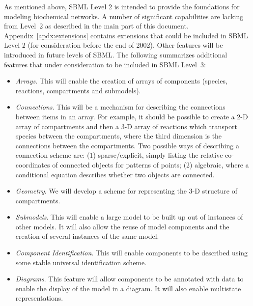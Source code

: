 \documentclass[10pt,twocolumntoc]{cekarticle}
\begin{document}
As mentioned above, SBML Level 2 is intended to provide the foundations for
modeling biochemical networks.  A number of significant capabilities are
lacking from Level~2 as described in the main part of this document.
Appendix~\ref{apdx:extensions} contains extensions that could be included
in SBML Level 2 (for consideration before the end of 2002). Other features
will be introduced in future levels of SBML.  The following summarizes
additional features that under consideration to be included in SBML
Level~3:
\begin{itemize}

\item \emph{Arrays}.  This will enable the creation of arrays of components
  (species, reactions, compartments and submodels).

\item \emph{Connections}.  This will be a mechanism for describing the
  connections between items in an array.  For example, it should be
  possible to create a 2-D array of compartments and then a 3-D array of
  reactions which transport species between the compartments, where the
  third dimension is the connections between the compartments.  Two
  possible ways of describing a connection scheme are: (1) sparse/explicit,
  simply listing the relative co-coordinates of connected objects for
  patterns of points; (2) algebraic, where a conditional equation describes
  whether two objects are connected.

\item \emph{Geometry}.  We will develop a scheme for representing the 3-D
  structure of compartments.

\item \emph{Submodels}.  This will enable a large model to be built up out
  of instances of other models.  It will also allow the reuse of model
  components and the creation of several instances of the same model.

\item \emph{Component Identification}.  This will enable components to be
  described using some stable universal identification scheme.

\item \emph{Diagrams}.  This feature will allow components to be
annotated
  with data to enable the display of the model in a diagram.  It will also
  enable multistate representations.


\end{itemize}
\end{document}
